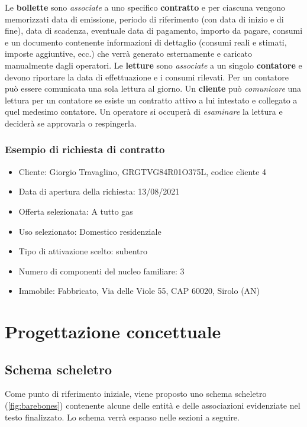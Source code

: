 \documentclass[a4paper,12pt]{report}
\begin{document}
\begin{mdframed}
\newline
Le \textbf{bollette} sono \textit{associate} a uno specifico \textbf{contratto} e per ciascuna vengono memorizzati data di emissione, periodo di riferimento (con data di inizio e di fine), data di scadenza, eventuale data di pagamento, importo da pagare, consumi e un documento contenente informazioni di dettaglio (consumi reali e stimati, imposte aggiuntive, ecc.) che verrà generato esternamente e caricato manualmente dagli operatori.
\newline
Le \textbf{letture} sono \textit{associate} a un singolo \textbf{contatore} e devono riportare la data di effettuazione e i consumi rilevati. Per un contatore può essere comunicata una sola lettura al giorno. Un \textbf{cliente} può \textit{comunicare} una lettura per un contatore se esiste un contratto attivo a lui intestato e collegato a quel medesimo contatore. Un operatore si occuperà di \textit{esaminare} la lettura e deciderà se approvarla o respingerla.
\end{mdframed}

\subsection{Esempio di richiesta di contratto}
\begin{mdframed}
\begin{itemize}
    \item Cliente: Giorgio Travaglino, GRGTVG84R01O375L, codice cliente 4
    \item Data di apertura della richiesta: 13/08/2021
    \item Offerta selezionata: A tutto gas
    \item Uso selezionato: Domestico residenziale
    \item Tipo di attivazione scelto: subentro
    \item Numero di componenti del nucleo familiare: 3
    \item Immobile: Fabbricato, Via delle Viole 55, CAP 60020, Sirolo (AN)
\end{itemize}
\end{mdframed}

\chapter{Progettazione concettuale}

\section{Schema scheletro}
Come punto di riferimento iniziale, viene proposto uno schema scheletro (\cref{fig:barebones}) contenente alcune delle entità e delle associazioni evidenziate nel testo finalizzato. Lo schema verrà espanso nelle sezioni a seguire.
\end{document}
